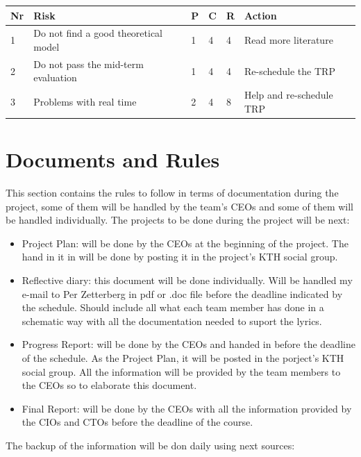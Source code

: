 \documentclass[11pt]{article}
\begin{document}
\begin{table}[h]
\label{tablerisk}
\centering
\begin{tabular}{l| l| l| l| l| l}
 Nr &Risk  &P  &C  &R &Action  \\
 \hline
 1 & Do not find a good theoretical model & 1 & 4 & 4 & Read more literature\\
 2 & Do not pass the mid-term evaluation & 1 & 4 & 4 & Re-schedule the TRP\\
 3 & Problems with real time & 2 & 4 & 8 & Help and re-schedule TRP \\
\end{tabular}
\end{table}



\section{Documents and Rules}
This section contains the rules to follow in terms of documentation during the project, some of them will be handled by the team's CEOs and some of them will be handled individually. The projects to be done during the project will be next:

\begin{itemize}
\item Project Plan: will be done by the CEOs at the beginning of the project. The hand in it in will be done by posting it in the project's KTH social group.

\item Reflective diary: this document will be done individually. Will be handled my e-mail to Per Zetterberg in pdf or .doc file before the deadline indicated by the schedule. Should include all what each team member has done in a schematic way with all the documentation needed to suport the lyrics.

\item Progress Report: will be done by the CEOs and handed in before the deadline of the schedule. As the Project Plan, it will be posted in the porject's KTH social group.  All the information will be provided by the team members to the CEOs so to elaborate this document.

\item Final Report: will be done by the CEOs with all the information provided by the CIOs and CTOs before the deadline of the course.
\end{itemize}


The backup of the information will be don daily using next sources:
\end{document}
